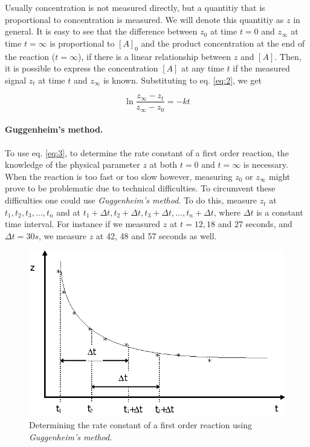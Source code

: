 Usually concentration is not measured directly, but a quantitiy that is proportional to concentration is measured. We will denote this quantitiy as $z$ in general.
It is easy to see that the difference between $z_0$ at time $t = 0$ and $z_\infty$ at time $t = \infty$ is proportional to $[A]_0$ and the product concentration at the end of the reaction ($t = \infty$), if there is a linear relationship between $z$ and $[A]$.
Then, it is possible to express the concentration $[A]$ at any time $t$ if the measured signal $z_t$ at time $t$ and $z_{\infty}$ is known.
Substituting to eq. \ref{eq:2}, we get

\begin{equation}
\label{eq:3}
        \ln 
        \frac{z_{\infty}-z_t}{z_{\infty}-z_0}
        =
        - k
        t
\end{equation}


\paragraph{Guggenheim's method.}
To use eq. \ref{eq:3}, to determine the rate constant of a first order reaction, the knowledge of the physical parameter $z$ at both $t=0$ and $t=\infty$ is necessary.
When the reaction is too fast or too slow however, measuring $z_0$ or $z_\infty$ might prove to be problematic due to technical difficulties.
To circumvent these difficulties one could use \emph{Guggenheim's method}. To do this, measure $z_t$ at $t_1, t_2, t_3, ... , t_n$ and at $t_1+\Delta t, t_2+\Delta t, t_3+\Delta t, ... , t_n+\Delta t$, where $\Delta t$ is a constant time interval.
For instance if we measured $z$ at $t= 12, 18$ and $27$ seconds, and $\Delta t = 30 s$, we measure $z$ at 42, 48 and 57 seconds as well.

\begin{figure}[h]
\centering
\label{fig_els2}
\includegraphics{fig/els2.eps}
\caption{Determining the rate constant of a first order reaction using \emph{Guggenheim's method}.}
\end{figure}

